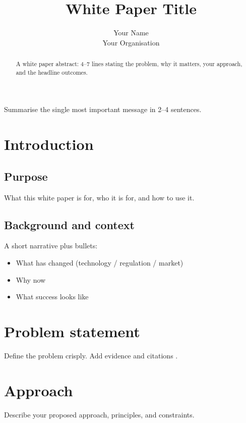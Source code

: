 \documentclass[11pt,a4paper]{article}
\title{\vspace{-1.0em}\textbf{White Paper Title}\\[0.25em]
\large\thesubtitle}
\author{Your Name \\ \small Your Organisation}
\date{\thereportdate}
\begin{document}
\maketitle
\vspace{-0.5em}

\begin{abstract}
A white paper abstract: 4–7 lines stating the problem, why it matters, your approach,
and the headline outcomes.
\end{abstract}

\begin{keytakeaway}
Summarise the single most important message in 2–4 sentences.
\end{keytakeaway}

\vspace{0.5em}
\tableofcontents
\newpage

\section{Introduction}
\subsection{Purpose}
What this white paper is for, who it is for, and how to use it.

\subsection{Background and context}
A short narrative plus bullets:
\begin{itemize}
  \item What has changed (technology / regulation / market)
  \item Why now
  \item What success looks like
\end{itemize}

\section{Problem statement}
Define the problem crisply. Add evidence and citations \parencite{somekey}.

\section{Approach}
Describe your proposed approach, principles, and constraints.
\end{document}
